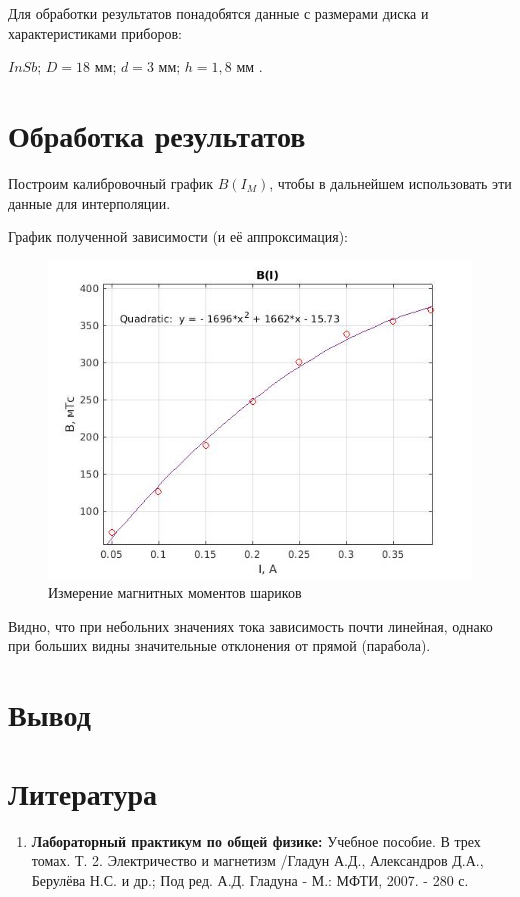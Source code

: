 \documentclass[a4paper, 12pt]{article}%
\begin{document}
Для обработки результатов понадобятся данные с размерами диска и характеристиками приборов:

$InSb$; $D = 18\text{ мм}$; $d = 3\text{ мм}$; $h = 1,8\text{ мм}$ .





\section{Обработка результатов}

Построим калибровочный график $B(I_M)$, чтобы в дальнейшем использовать эти данные для интерполяции.


График полученной зависимости (и её аппроксимация):

\newpage

\begin{center}
\begin{figure}[h]
    \centering
    \includegraphics[width = 10 cm]{B(I).jpg}
    \caption{Измерение магнитных моментов шариков}
    \label{msh1}
\end{figure}
\end{center}

Видно, что при небольних значениях тока зависимость почти линейная, однако при больших видны значительные отклонения от прямой (парабола). 

\section{Вывод}



\section{Литература}

\begin{enumerate}
\item \textbf{Лабораторный практикум по общей физике:} Учебное пособие. В трех томах. Т. 2. Электричество и магнетизм /Гладун А.Д., Александров Д.А., Берулёва Н.С. и др.; Под ред. А.Д. Гладуна - М.: МФТИ, 2007. - 280 с.

\end{enumerate}		
		
\end{document}
